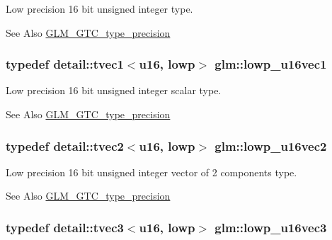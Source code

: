 Low precision 16 bit unsigned integer type. \begin{DoxySeeAlso}{See Also}
\hyperlink{group__gtc__type__precision}{G\-L\-M\-\_\-\-G\-T\-C\-\_\-type\-\_\-precision} 
\end{DoxySeeAlso}
\hypertarget{group__gtc__type__precision_ga25464b09e8e3c63f6896605e0c997eb1}{
\subsubsection[{lowp\-\_\-u16vec1}]{\setlength{\rightskip}{0pt plus 5cm}typedef detail\-::tvec1$<$u16, lowp$>$ {\bf glm\-::lowp\-\_\-u16vec1}}}\label{group__gtc__type__precision_ga25464b09e8e3c63f6896605e0c997eb1}
Low precision 16 bit unsigned integer scalar type. \begin{DoxySeeAlso}{See Also}
\hyperlink{group__gtc__type__precision}{G\-L\-M\-\_\-\-G\-T\-C\-\_\-type\-\_\-precision} 
\end{DoxySeeAlso}
\hypertarget{group__gtc__type__precision_gaff5ca5a8bc621bb8f4b28f046c0de508}{
\subsubsection[{lowp\-\_\-u16vec2}]{\setlength{\rightskip}{0pt plus 5cm}typedef detail\-::tvec2$<$u16, lowp$>$ {\bf glm\-::lowp\-\_\-u16vec2}}}\label{group__gtc__type__precision_gaff5ca5a8bc621bb8f4b28f046c0de508}
Low precision 16 bit unsigned integer vector of 2 components type. \begin{DoxySeeAlso}{See Also}
\hyperlink{group__gtc__type__precision}{G\-L\-M\-\_\-\-G\-T\-C\-\_\-type\-\_\-precision} 
\end{DoxySeeAlso}
\hypertarget{group__gtc__type__precision_ga74d5491c9ee66d068309d200601e907b}{
\subsubsection[{lowp\-\_\-u16vec3}]{\setlength{\rightskip}{0pt plus 5cm}typedef detail\-::tvec3$<$u16, lowp$>$ {\bf glm\-::lowp\-\_\-u16vec3}}}\label{group__gtc__type__precision_ga74d5491c9ee66d068309d200601e907b}
